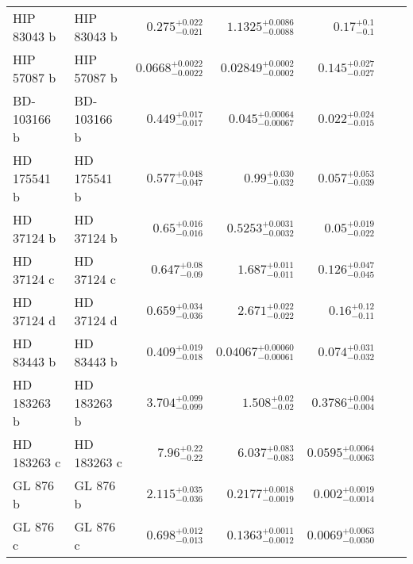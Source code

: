\begin{longtable*}{llrrrrr}
HIP 83043 b & HIP 83043 b & $0.275^{+0.022}_{-0.021}$ & $1.1325^{+0.0086}_{-0.0088}$ & $0.17^{+0.1}_{-0.1}$ & \cite{Johnson10} & \\ 
HIP 57087 b & HIP 57087 b & $0.0668^{+0.0022}_{-0.0022}$ & $0.02849^{+0.0002}_{-0.0002}$ & $0.145^{+0.027}_{-0.027}$ & \cite{Butler04} & \\ 
BD-103166 b & BD-103166 b & $0.449^{+0.017}_{-0.017}$ & $0.045^{+0.00064}_{-0.00067}$ & $0.022^{+0.024}_{-0.015}$ & \cite{Butler00} & \\ 
HD 175541 b & HD 175541 b & $0.577^{+0.048}_{-0.047}$ & $0.99^{+0.030}_{-0.032}$ & $0.057^{+0.053}_{-0.039}$ & \cite{Johnson07} & \\ 
HD 37124 b & HD 37124 b & $0.65^{+0.016}_{-0.016}$ & $0.5253^{+0.0031}_{-0.0032}$ & $0.05^{+0.019}_{-0.022}$ & \cite{Butler03} & \\ 
HD 37124 c & HD 37124 c & $0.647^{+0.08}_{-0.09}$ & $1.687^{+0.011}_{-0.011}$ & $0.126^{+0.047}_{-0.045}$ & \cite{Butler03} & \\ 
HD 37124 d & HD 37124 d & $0.659^{+0.034}_{-0.036}$ & $2.671^{+0.022}_{-0.022}$ & $0.16^{+0.12}_{-0.11}$ & \cite{Vogt05} & \\ 
HD 83443 b & HD 83443 b & $0.409^{+0.019}_{-0.018}$ & $0.04067^{+0.00060}_{-0.00061}$ & $0.074^{+0.031}_{-0.032}$ & \cite{Butler02} & \\ 
HD 183263 b & HD 183263 b & $3.704^{+0.099}_{-0.099}$ & $1.508^{+0.02}_{-0.02}$ & $0.3786^{+0.004}_{-0.004}$ & \cite{Marcy05} & \\ 
HD 183263 c & HD 183263 c & $7.96^{+0.22}_{-0.22}$ & $6.037^{+0.083}_{-0.083}$ & $0.0595^{+0.0064}_{-0.0063}$ & \cite{Wright09} & \\ 
GL 876 b & GL 876 b & $2.115^{+0.035}_{-0.036}$ & $0.2177^{+0.0018}_{-0.0019}$ & $0.002^{+0.0019}_{-0.0014}$ & \cite{Marcy01} & \\ 
GL 876 c & GL 876 c & $0.698^{+0.012}_{-0.013}$ & $0.1363^{+0.0011}_{-0.0012}$ & $0.0069^{+0.0063}_{-0.0050}$ & \cite{Marcy01} & \\ 
\bottomrule 
\end{longtable*} 
